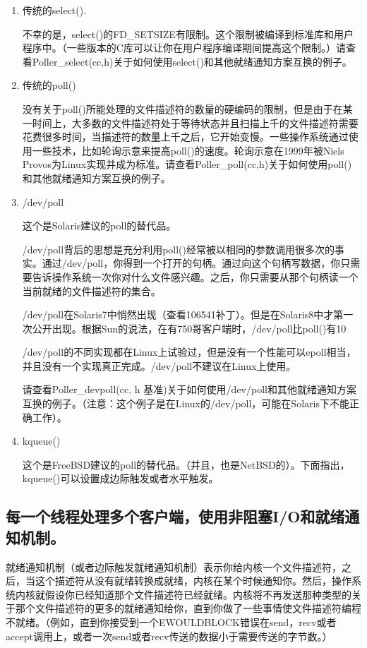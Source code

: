 \documentclass[twoside, xetex]{report}
\begin{document}
	\begin{enumerate}
	
	\item 传统的select().
	
	不幸的是，select()的FD\_SETSIZE有限制。这个限制被编译到标准库和用户程序中。（一些版本的C库可以让你在用户程序编译期间提高这个限制。）请查看Poller\_select(cc,h)关于如何使用select()和其他就绪通知方案互换的例子。
	
	\item 传统的poll()
	
	没有关于poll()所能处理的文件描述符的数量的硬编码的限制，但是由于在某一时间上，大多数的文件描述符处于等待状态并且扫描上千的文件描述符需要花费很多时间，当描述符的数量上千之后，它开始变慢。一些操作系统通过使用一些技术，比如轮询示意来提高poll()的速度。轮询示意在1999年被Niels Provos为Linux实现并成为标准。请查看Poller\_poll(cc,h)关于如何使用poll()和其他就绪通知方案互换的例子。
	
	\item /dev/poll
	
	这个是Solaris建议的poll的替代品。
	
	/dev/poll背后的思想是充分利用poll()经常被以相同的参数调用很多次的事实。通过/dev/poll，你得到一个打开的句柄。通过向这个句柄写数据，你只需要告诉操作系统一次你对什么文件感兴趣。之后，你只需要从那个句柄读一个当前就绪的文件描述符的集合。
	
	/dev/poll在Solaris7中悄然出现（查看106541补丁）。但是在Solaris8中才第一次公开出现。根据Sun的说法，在有750哥客户端时，/dev/poll比poll()有10%
	
	/dev/poll的不同实现都在Linux上试验过，但是没有一个性能可以epoll相当，并且没有一个实现真正完成。/dev/poll不建议在Linux上使用。
	
	请查看Poller\_devpoll(cc, h 基准)关于如何使用/dev/poll和其他就绪通知方案互换的例子。（注意：这个例子是在Linux的/dev/poll，可能在Solaris下不能正确工作）。
	\item kqueue()
	
	这个是FreeBSD建议的poll的替代品。（并且，也是NetBSD的）。下面指出，kqueue()可以设置成边际触发或者水平触发。
	
	\end{enumerate}
	
\subsection*{每一个线程处理多个客户端，使用非阻塞I/O和就绪通知机制。}

	就绪通知机制（或者边际触发就绪通知机制）表示你给内核一个文件描述符，之后，当这个描述符从没有就绪转换成就绪，内核在某个时候通知你。然后，操作系统内核就假设你已经知道那个文件描述符已经就绪。内核将不再发送那种类型的关于那个文件描述符的更多的就绪通知给你，直到你做了一些事情使文件描述符编程不就绪。（例如，直到你接受到一个EWOULDBLOCK错误在send，recv或者accept调用上，或者一次send或者recv传送的数据小于需要传送的字节数。）
	
\end{document}

